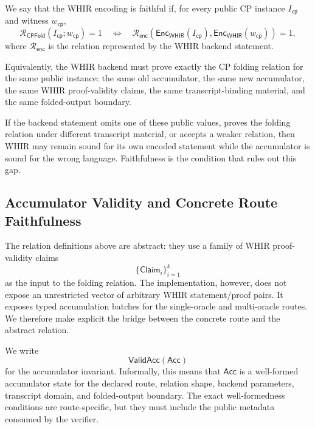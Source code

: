 \documentclass[11pt]{article}
\theoremstyle{definition}
\newcommand{\WHIR}{\mathsf{WHIR}}
\newcommand{\Acc}{\mathsf{Acc}}
\newcommand{\Rcp}{\mathcal{R}_{\mathsf{CPFold}}}
\newcommand{\Renc}{\mathcal{R}_{\mathsf{enc}}}
\begin{document}
We say that the WHIR encoding is faithful if, for every public CP instance
$I_{\mathsf{cp}}$ and witness $w_{\mathsf{cp}}$,
\[
  \Rcp(I_{\mathsf{cp}};w_{\mathsf{cp}})=1
  \quad\Longleftrightarrow\quad
  \Renc
  \left(
    \mathsf{Enc}_{\WHIR}(I_{\mathsf{cp}}),
    \mathsf{Enc}_{\WHIR}(w_{\mathsf{cp}})
  \right)=1,
\]
where $\Renc$ is the relation represented by the WHIR backend
statement.

Equivalently, the WHIR backend must prove exactly the CP folding relation for
the same public instance: the same old accumulator, the same new accumulator,
the same WHIR proof-validity claims, the same transcript-binding material, and
the same folded-output boundary.

If the backend statement omits one of these public values, proves the folding
relation under different transcript material, or accepts a weaker relation, then
WHIR may remain sound for its own encoded statement while the accumulator is
sound for the wrong language. Faithfulness is the condition that rules out this
gap.

\subsection{Accumulator Validity and Concrete Route Faithfulness}
\label{sec:accumulator-validity-and-route-faithfulness}

The relation definitions above are abstract: they use a family of WHIR
proof-validity claims
\[
  \{\mathsf{Claim}_i\}_{i=1}^k
\]
as the input to the folding relation. The implementation, however, does not
expose an unrestricted vector of arbitrary WHIR statement/proof pairs. It
exposes typed accumulation batches for the single-oracle and multi-oracle
routes. We therefore make explicit the bridge between the concrete route and the
abstract relation.

We write
\[
  \mathsf{ValidAcc}(\Acc)
\]
for the accumulator invariant. Informally, this means that \(\Acc\) is a
well-formed accumulator state for the declared route, relation shape, backend
parameters, transcript domain, and folded-output boundary. The exact
well-formedness conditions are route-specific, but they must include the public
metadata consumed by the verifier.
\end{document}
